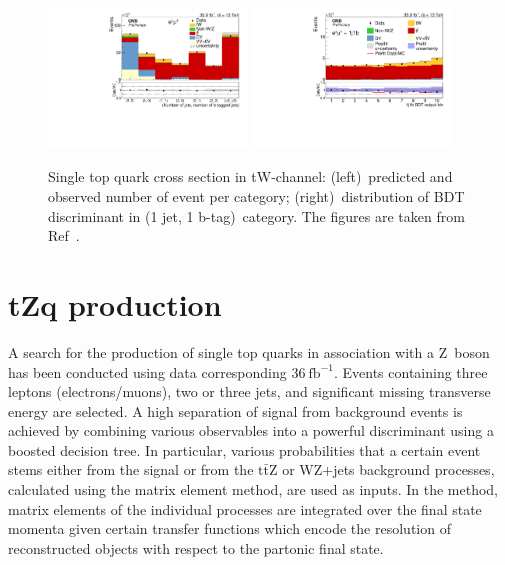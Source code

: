 \documentclass[12pt]{article}
\begin{document}
\begin{figure}[!htb]
\begin{center}
\includegraphics[width=0.47\textwidth]{tW-categories.pdf}\hspace{0.02\textwidth}
\includegraphics[width=0.47\textwidth]{tW-bdt.pdf}
\caption{\label{fig:tw}Single top quark cross section in tW-channel: (left)~predicted and observed number of event per category; (right)~distribution of BDT discriminant in (1 jet, 1 b-tag)~category. The figures are taken from Ref~\cite{tw-inc}.}
\end{center}
\end{figure}


\section{tZq production}

A search for the production of single top quarks in association with a Z~boson has been conducted using data corresponding $36~\mathrm{fb}^{-1}$. Events containing three leptons (electrons/muons), two or three jets, and significant missing transverse energy are selected. A high separation of signal from background events is achieved by combining various observables into a powerful discriminant using a boosted decision tree. In particular, various probabilities that a certain event stems either from the signal or from the $\mathrm{t}\bar{\mathrm{t}}\mathrm{Z}$ or WZ+jets background processes, calculated using the matrix element method, are used as inputs. In the method, matrix elements of the individual processes are integrated over the final state momenta given certain transfer functions which encode the resolution of reconstructed objects with respect to the partonic final state.
\end{document}
